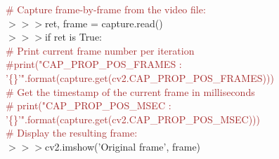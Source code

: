 \documentclass[a4paper,18pt]{article}
\begin{document}
{{{{{{{{{\textcolor{brown}{\# Capture frame-by-frame from the video file:}\\
\hspace*{14pt}$>>>$\hspace*{28pt}ret, frame = capture.read()\\

\hspace*{14pt}$>>>$\hspace*{28pt}if ret is True:\\

{\textcolor{brown}{\# Print current frame number per iteration}\\ {\textcolor{brown}{\#print("CAP\_PROP\_POS\_FRAMES : '\{\}'".format(capture.get(cv2.CAP\_PROP\_POS\_FRAMES)))}\\

{\textcolor{brown}{\# Get the timestamp of the current frame in milliseconds}\\
{\textcolor{brown}{\# print("CAP\_PROP\_POS\_MSEC : '\{\}'".format(capture.get(cv2.CAP\_PROP\_POS\_MSEC)))}\\

{\textcolor{brown}{\# Display the resulting frame:}\\
\hspace*{14pt}$>>>$\hspace*{42pt}cv2.imshow('Original frame', frame)\\

}}}}}}}}}}}}}}
\end{document}
